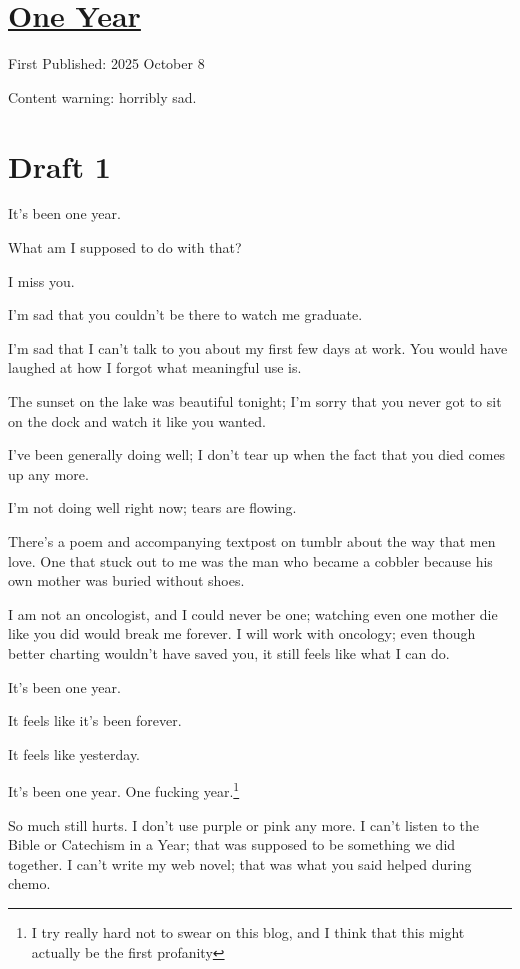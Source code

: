 \documentclass[12pt]{article}
\renewcommand{\,}{\textsuperscript{,}}
\begin{document}
  
\doublespacing  
\section{\href{one-year.html}{One Year}}  
First Published: 2025 October 8

Content warning: horribly sad.

\section{Draft 1}

It's been one year.

What am I supposed to do with that?

I miss you.

I'm sad that you couldn't be there to watch me graduate.

I'm sad that I can't talk to you about my first few days at work.  
You would have laughed at how I forgot what meaningful use is.

The sunset on the lake was beautiful tonight; I'm sorry that you never got to sit on the dock and watch it like you wanted.

I've been generally doing well; I don't tear up when the fact that you died comes up any more.

I'm not doing well right now; tears are flowing.

There's a poem and accompanying textpost on tumblr about the way that men love.  
One that stuck out to me was the man who became a cobbler because his own mother was buried without shoes.

I am not an oncologist, and I could never be one; watching even one mother die like you did would break me forever.  
I will work with oncology; even though better charting wouldn't have saved you, it still feels like what I can do.

It's been one year.

It feels like it's been forever.

It feels like yesterday.

It's been one year.  
One fucking year.\footnote{I try really hard not to swear on this blog, and I think that this might actually be the first profanity}

So much still hurts.  
I don't use purple or pink any more.  
I can't listen to the Bible or Catechism in a Year; that was supposed to be something we did together.  
I can't write my web novel; that was what you said helped during chemo.
\end{document}
